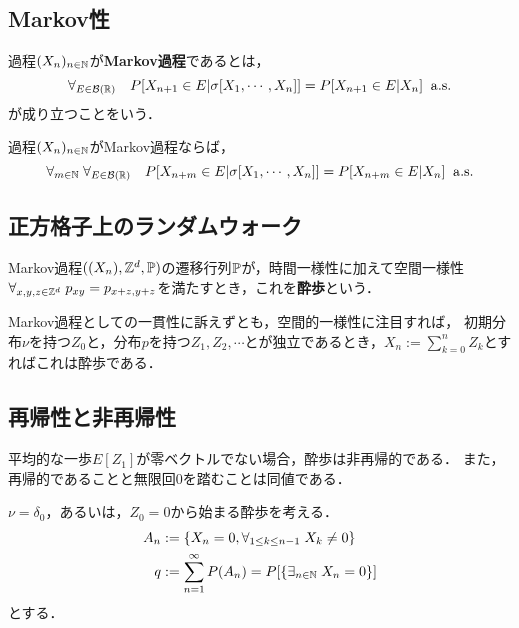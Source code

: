 \documentclass[uplatex,dvipdfmx]{jsreport}
\begin{document}
\subsection{Markov性}

\begin{definition}
    過程$(X_n)_{n\in\mathbb{N}}$が\textbf{Markov過程}であるとは，
    \[\forall_{E\in\mathcal{B}(\mathbb{R})}\quad P[X_{n+1}\in E|\sigma[X_1,\cdots,X_n]]=P[X_{n+1}\in E|X_n]\;\;\mathrm{a.s.}\]
    が成り立つことをいう．
\end{definition}

\begin{lemma}[Markov性の特徴付け]
    過程$(X_n)_{n\in\mathbb{N}}$がMarkov過程ならば，
    \[\forall_{m\in\mathbb{N}}\;\forall_{E\in\mathcal{B}(\mathbb{R})}\quad P[X_{n+m}\in E|\sigma[X_1,\cdots,X_n]]=P[X_{n+m}\in E|X_n]\;\;\mathrm{a.s.}\]
\end{lemma}

\subsection{正方格子上のランダムウォーク}

\begin{definition}
    Markov過程$((X_n),\mathbb{Z}^d,\mathbb{P})$の遷移行列$\mathbb{P}$が，時間一様性に加えて空間一様性$\forall_{x,y,z\in\mathbb{Z}^d}\;p_{xy}=p_{x+z,y+z}$を満たすとき，これを\textbf{酔歩}という．
\end{definition}

\begin{discussion}[加法過程としての構成]\label{discussion-random-walk}
    Markov過程としての一貫性に訴えずとも，空間的一様性に注目すれば，
    初期分布$\nu$を持つ$Z_0$と，分布$p$を持つ$Z_1,Z_2,\cdots$とが独立であるとき，$X_n:=\sum^n_{k=0}Z_k$とすればこれは酔歩である．
\end{discussion}

\subsection{再帰性と非再帰性}

\begin{tcolorbox}[colframe=ForestGreen, colback=ForestGreen!10!white,breakable,colbacktitle=ForestGreen!40!white,coltitle=black,fonttitle=\bfseries\sffamily,
title=]
    平均的な一歩$E[Z_1]$が零ベクトルでない場合，酔歩は非再帰的である．
    また，再帰的であることと無限回$0$を踏むことは同値である．
\end{tcolorbox}

\begin{notation}
    $\nu=\delta_0$，あるいは，$Z_0=0$から始まる酔歩を考える．
    \begin{align*}
        A_n&:=\left\{X_n=0,\forall_{1\le k\le n-1}\;X_k\ne0\right\}\\
        q&:=\sum^\infty_{n=1}P(A_n)=P[\left\{\exists_{n\in\mathbb{N}}\;X_n=0\right\}]
    \end{align*}
    とする．
\end{notation}
\end{document}
